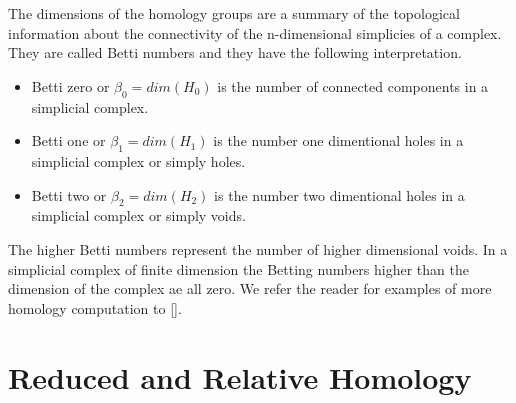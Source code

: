 The dimensions of the homology groups are a summary of the topological information about the connectivity of the n-dimensional simplicies of a complex. They are called Betti numbers and they have the following interpretation.

\begin{itemize}
    \item Betti zero or $\beta_0 = dim(H_0)$ is the number of connected components in a simplicial complex.
    \item Betti one  or $\beta_1 = dim(H_1)$ is the number one dimentional holes in a simplicial complex or simply holes.
    \item Betti two  or $\beta_2 = dim(H_2)$ is the number two dimentional holes in a simplicial complex or simply voids.
\end{itemize}

The higher Betti numbers represent the number of higher dimensional voids. In a simplicial complex of finite dimension the Betting numbers higher than the dimension of the complex ae all zero. We refer the reader for examples of more homology computation to [].






\section{Reduced and Relative Homology}

